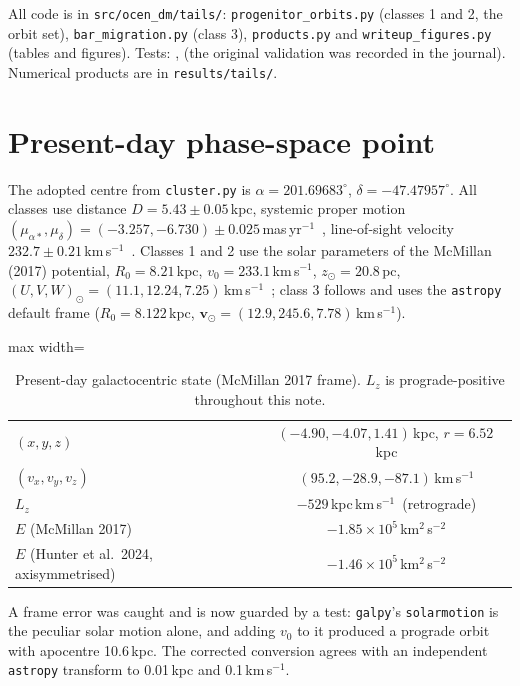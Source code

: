 \documentclass[11pt,a4paper]{article}
\newcommand{\masyr}{mas\,yr$^{-1}$}
\newcommand{\kms}{km\,s$^{-1}$}
\newcommand{\Lz}{L_z}
\begin{document}
All code is in \texttt{src/ocen\_dm/tails/}: \texttt{progenitor\_orbits.py} (classes 1 and 2,
the orbit set), \texttt{bar\_migration.py} (class 3), \texttt{products.py} and
\texttt{writeup\_figures.py} (tables and figures). Tests: ,
 (the original validation was recorded in the journal). Numerical products are in
\texttt{results/tails/}.

\section{Present-day phase-space point}
\label{sec:present}

The adopted centre from \texttt{cluster.py} is
$\alpha=201.69683^\circ$, $\delta=-47.47957^\circ$.
All classes use distance $D=5.43\pm0.05$\,kpc, systemic
proper motion $(\mu_{\alpha*},\mu_\delta)=(-3.257,-6.730)\pm0.025$\,\masyr\
\citep{vasiliev2021}, line-of-sight velocity $232.7\pm0.21$\,\kms\ \citep{baumgardt2021}.
Classes 1 and 2 use the solar parameters of the McMillan (2017) potential, $R_0=8.21$\,kpc,
$v_0=233.1$\,\kms, $z_\odot=20.8$\,pc, $(U,V,W)_\odot=(11.1,12.24,7.25)$\,\kms\
\citep{schoenrich2010}; class 3 follows \citet{dillamore2026} and uses the \texttt{astropy}
default frame ($R_0=8.122$\,kpc, $\mathbf v_\odot=(12.9,245.6,7.78)$\,\kms).

\begin{table}[h]\centering
\caption{Present-day galactocentric state (McMillan 2017 frame). $\Lz$ is prograde-positive
throughout this note.}
\begin{adjustbox}{max width=\linewidth}
\begin{tabular}{lc}\toprule
$(x,y,z)$ & $(-4.90,-4.07,1.41)$\,kpc, $r=6.52$\,kpc\\
$(v_x,v_y,v_z)$ & $(95.2,-28.9,-87.1)$\,\kms\\
$\Lz$ & $-529$\,kpc\,\kms\ (retrograde)\\
$E$ (McMillan 2017) & $-1.85\times10^5$\,km$^2$\,s$^{-2}$\\
$E$ (Hunter et al.\ 2024, axisymmetrised) & $-1.46\times10^5$\,km$^2$\,s$^{-2}$\\
\bottomrule\end{tabular}
\end{adjustbox}
\end{table}

A frame error was caught and is now guarded by a test: \texttt{galpy}'s \texttt{solarmotion}
is the peculiar solar motion alone, and adding $v_0$ to it produced a prograde orbit with
apocentre 10.6\,kpc. The corrected conversion agrees with an independent \texttt{astropy}
transform to 0.01\,kpc and 0.1\,\kms.
\end{document}
